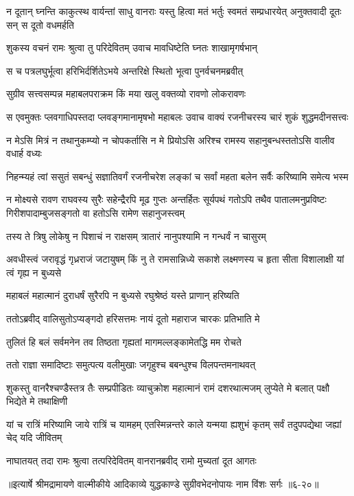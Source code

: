 \threelineshloka
{न दूतान् घ्नन्ति काकुत्स्थ वार्यन्तां साधु वानराः}
{यस्तु हित्वा मतं भर्तुः स्वमतं सम्प्रधारयेत्}
{अनुक्तवादी दूतः सन् स दूतो वधमर्हति} %

\twolineshloka
{शुकस्य वचनं रामः श्रुत्वा तु परिदेवितम्}
{उवाच मावधिष्टेति घ्नतः शाखामृगर्षभान्} %

\twolineshloka
{स च पत्रलघुर्भूत्वा हरिभिर्दर्शितेऽभये}
{अन्तरिक्षे स्थितो भूत्वा पुनर्वचनमब्रवीत्} %

\twolineshloka
{सुग्रीव सत्त्वसम्पन्न महाबलपराक्रम}
{किं मया खलु वक्तव्यो रावणो लोकरावणः} %

\twolineshloka
{स एवमुक्तः प्लवगाधिपस्तदा प्लवङ्गमानामृषभो महाबलः}
{उवाच वाक्यं रजनीचरस्य चारं शुकं शुद्धमदीनसत्त्वः} %

\twolineshloka
{न मेऽसि मित्रं न तथानुकम्प्यो न चोपकर्तासि न मे प्रियोऽसि}
{अरिश्च रामस्य सहानुबन्धस्ततोऽसि वालीव वधार्ह वध्यः} %

\twolineshloka
{निहन्म्यहं त्वां ससुतं सबन्धुं सज्ञातिवर्गं रजनीचरेश}
{लङ्कां च सर्वां महता बलेन सर्वैः करिष्यामि समेत्य भस्म} %

\threelineshloka
{न मोक्ष्यसे रावण राघवस्य सुरैः सहेन्द्रैरपि मूढ गुप्तः}
{अन्तर्हितः सूर्यपथं गतोऽपि तथैव पातालमनुप्रविष्टः}
{गिरीशपादाम्बुजसङ्गतो वा हतोऽसि रामेण सहानुजस्त्वम्} %

\twolineshloka
{तस्य ते त्रिषु लोकेषु न पिशाचं न राक्षसम्}
{त्रातारं नानुपश्यामि न गन्धर्वं न चासुरम्} %

\threelineshloka
{अवधीस्त्वं जरावृद्धं गृध्रराजं जटायुषम्}
{किं नु ते रामसान्निध्ये सकाशे लक्ष्मणस्य च}
{हृता सीता विशालाक्षी यां त्वं गृह्य न बुध्यसे} %

\twolineshloka
{महाबलं महात्मानं दुराधर्षं सुरैरपि}
{न बुध्यसे रघुश्रेष्ठं यस्ते प्राणान् हरिष्यति} %

\twolineshloka
{ततोऽब्रवीद् वालिसुतोऽप्यङ्गदो हरिसत्तमः}
{नायं दूतो महाराज चारकः प्रतिभाति मे} %

\twolineshloka
{तुलितं हि बलं सर्वमनेन तव तिष्ठता}
{गृह्यतां मागमल्लङ्कामेतद्धि मम रोचते} %

\twolineshloka
{ततो राज्ञा समादिष्टाः समुत्पत्य वलीमुखाः}
{जगृहुश्च बबन्धुश्च विलपन्तमनाथवत्} %

\threelineshloka
{शुकस्तु वानरैश्चण्डैस्तत्र तैः सम्प्रपीडितः}
{व्याचुक्रोश महात्मानं रामं दशरथात्मजम्}
{लुप्येते मे बलात् पक्षौ भिद्येते मे तथाक्षिणी} %

\threelineshloka
{यां च रात्रिं मरिष्यामि जाये रात्रिं च यामहम्}
{एतस्मिन्नन्तरे काले यन्मया ह्यशुभं कृतम्}
{सर्वं तदुपपद्येथा जह्यां चेद् यदि जीवितम्} %

\twolineshloka
{नाघातयत् तदा रामः श्रुत्वा तत्परिदेवितम्}
{वानरानब्रवीद् रामो मुच्यतां दूत आगतः} %


॥इत्यार्षे श्रीमद्रामायणे वाल्मीकीये आदिकाव्ये युद्धकाण्डे सुग्रीवभेदनोपायः नाम विंशः सर्गः ॥६-२०॥
